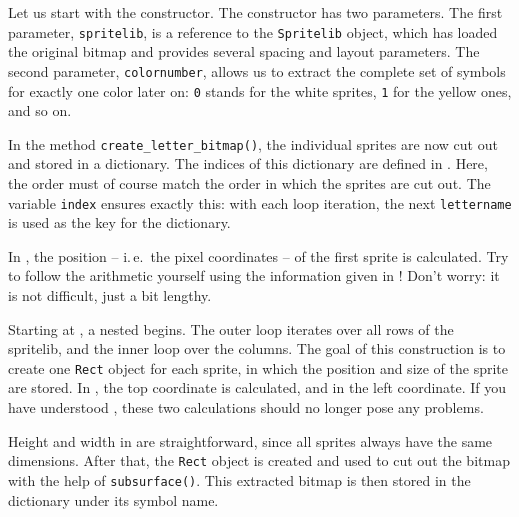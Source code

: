 Let us start with the constructor. The constructor has two parameters. The first parameter, \texttt{spritelib}, is a reference to the \texttt{Spritelib} object, which has loaded the original bitmap and provides several spacing and layout parameters. The second parameter, \texttt{colornumber}, allows us to extract the complete set of symbols for exactly one color later on: \texttt{0} stands for the white sprites, \texttt{1} for the yellow ones, and so on.



In the method \texttt{create\_letter\_bitmap()}, the individual sprites are now cut out and stored in a dictionary. The indices of this dictionary are defined in . Here, the order must of course match the order in which the sprites are cut out. The variable \texttt{index} ensures exactly this: with each loop iteration, the next \texttt{lettername} is used as the key for the dictionary.

In , the position -- i.\,e.\ the pixel coordinates -- of the first sprite is calculated. Try to follow the arithmetic yourself using the information given in ! Don’t worry: it is not difficult, just a bit lengthy.

Starting at , a nested \forSchleife{} begins. The outer loop iterates over all rows of the spritelib, and the inner loop over the columns. The goal of this construction is to create one \texttt{Rect} object for each sprite, in which the position and size of the sprite are stored. In , the top coordinate is calculated, and in  the left coordinate. If you have understood , these two calculations should no longer pose any problems. 

Height and width in  are straightforward, since all sprites always have the same dimensions. After that, the \texttt{Rect} object is created and used to cut out the bitmap with the help of \texttt{subsurface()}. This extracted bitmap is then stored in the dictionary under its symbol name.




